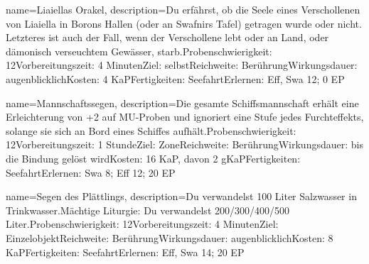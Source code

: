 {
    name={Liaiellas Orakel},
    description={Du erfährst, ob die Seele eines Verschollenen von Liaiella in Borons Hallen (oder an Swafnirs Tafel) getragen wurde oder nicht. Letzteres ist auch der Fall, wenn der Verschollene lebt oder an Land, oder dämonisch verseuchtem Gewässer, starb.\newline Probenschwierigkeit: 12\newline Vorbereitungszeit: 4 Minuten\newline Ziel: selbst\newline Reichweite: Berührung\newline Wirkungsdauer: augenblicklich\newline Kosten: 4 KaP\newline Fertigkeiten: Seefahrt\newline Erlernen: Eff, Swa 12; 0 EP}
}


{
    name={Mannschaftssegen},
    description={Die gesamte Schiffsmannschaft erhält eine Erleichterung von +2 auf MU-Proben und ignoriert eine Stufe jedes Furchteffekts, solange sie sich an Bord eines Schiffes aufhält.\newline Probenschwierigkeit: 12\newline Vorbereitungszeit: 1 Stunde\newline Ziel: Zone\newline Reichweite: Berührung\newline Wirkungsdauer: bis die Bindung gelöst wird\newline Kosten: 16 KaP, davon 2 gKaP\newline Fertigkeiten: Seefahrt\newline Erlernen: Swa 8; Eff 12; 20 EP}
}


{
    name={Segen des Plättlings},
    description={Du verwandelst 100 Liter Salzwasser in Trinkwasser.\newline Mächtige Liturgie: Du verwandelst 200/300/400/500 Liter.\newline Probenschwierigkeit: 12\newline Vorbereitungszeit: 4 Minuten\newline Ziel: Einzelobjekt\newline Reichweite: Berührung\newline Wirkungsdauer: augenblicklich\newline Kosten: 8 KaP\newline Fertigkeiten: Seefahrt\newline Erlernen: Eff, Swa 14; 20 EP}
}


